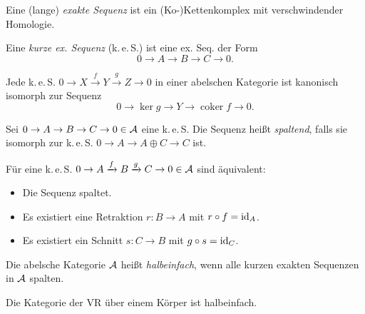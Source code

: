 \documentclass{cheat-sheet}
\newcommand{\keS}{k.\,e.\,S.} %
\DeclareMathOperator{\coker}{coker} %
\begin{document}



\begin{defn}
  Eine (lange) \emph{exakte Sequenz} ist ein (Ko-)Kettenkomplex mit verschwindender Homologie.
\end{defn}

\begin{defn}
  Eine \emph{kurze ex. Sequenz} (\keS{}) ist eine ex. Seq. der Form
  \[ 0 \to A \to B \to C \to 0. \]
\end{defn}

\begin{lem}
  Jede \keS{} $0 \to X \xrightarrow{f} Y \xrightarrow{g} Z \to 0$ in einer abelschen Kategorie ist kanonisch isomorph zur Sequenz
  \[ 0 \to \ker g \to Y \to \coker f \to 0. \]
\end{lem}

\begin{defn}
  Sei $0 \to A \to B \to C \to 0 \in \mathcal{A}$ eine \keS{}
  Die Sequenz heißt \emph{spaltend}, falls sie isomorph zur \keS{} $0 \to A \to A \oplus C \to C$ ist.
\end{defn}

\begin{prop}
  Für eine \keS{} $0 \to A \xrightarrow{f} B \xrightarrow{g} C \to 0 \in \mathcal{A}$ sind äquivalent:
  \begin{itemize}
    \item Die Sequenz spaltet.
    \item Es existiert eine Retraktion $r : B \to A$ mit $r \circ f = \operatorname{id}_A$.
    \item Es existiert ein Schnitt $s : C \to B$ mit $g \circ s = \operatorname{id}_C$.
  \end{itemize}
\end{prop}

\begin{defn}
  Die abelsche Kategorie $\mathcal{A}$ heißt \emph{halbeinfach}, wenn alle kurzen exakten Sequenzen in $\mathcal{A}$ spalten.
\end{defn}

\begin{bsp}
  Die Kategorie der VR über einem Körper ist halbeinfach.
\end{bsp}
\end{document}

